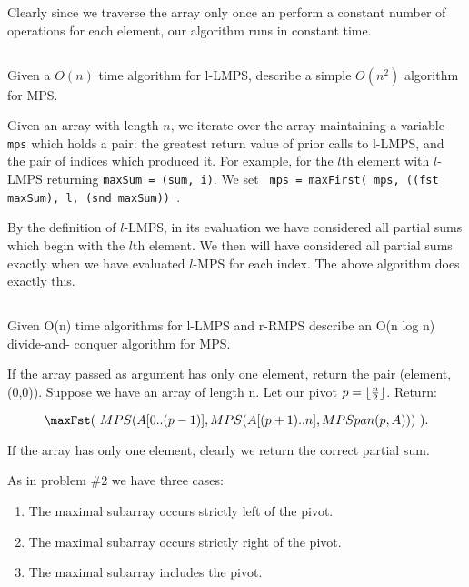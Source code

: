 \documentclass{amsart}
\theoremstyle{definition}
\theoremstyle{remark}
\numberwithin{equation}{section}
\DeclarePairedDelimiter{\floor}{\lfloor}{\rfloor}
\begin{document}
\rmk Clearly since we traverse the array only once an perform a constant number of operations
for each element, our algorithm runs in constant time.

\subsection{} Given a $O(n)$ time algorithm for l-LMPS, describe a simple $O(n^2)$ algorithm for MPS.


Given an array with length $n$, we iterate over the array maintaining a
variable \texttt{mps} which holds a pair: the greatest return value of prior calls to l-LMPS,
and the pair of indices which produced it. For example, for the $l$th element with $l$-LMPS
returning \texttt{maxSum = (sum, i)}. We set
\texttt{ mps = maxFirst( mps, ((fst maxSum), l, (snd maxSum)) }. 

\proof

By the definition of $l$-LMPS, in its evaluation we have considered
all partial sums which begin with the $l$th element. We then will have
considered all partial sums exactly when we have evaluated $l$-MPS for
each index. The above algorithm does exactly this.


\subsection{} Given O(n) time algorithms for l-LMPS and r-RMPS describe an O(n log n) divide-and- conquer algorithm for MPS.


If the array passed as argument has only one element, return the pair (element, (0,0)).
Suppose we have an array of length n. Let our pivot $p = \floor{ \frac{n}{2} }$.
Return:

$$ \maxFst (\ MPS( A[0..(p-1)], MPS( A[(p+1)..n], MPSpan(p, A) ) )\ ). $$

\proof

If the array has only one element, clearly we return the correct partial sum.

As in problem \#2 we have three cases:

\begin{enumerate}
  \item The maximal subarray occurs strictly left of the pivot.
  \item The maximal subarray occurs strictly right of the pivot.
  \item The maximal subarray includes the pivot.
\end{enumerate}
\end{document}
